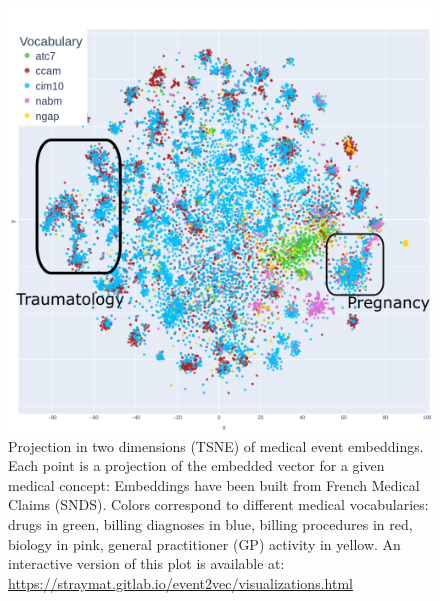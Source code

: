 \documentclass[french,12pt,twoside,a4paper]{book}
\begin{document}
\begin{figure}[!t]
  \begin{minipage}{0.32\textwidth}
    \caption{Projection in two dimensions (TSNE) of medical event embeddings.
      Each point is a projection of the embedded vector for a given medical
      concept: Embeddings have been built from French Medical Claims (SNDS).
      Colors correspond to different medical vocabularies: drugs in green, billing
      diagnoses in blue, billing procedures in red, biology in pink, general
      practitioner (GP) activity in yellow. An interactive version of this plot
      is available at:
      \url{https://straymat.gitlab.io/event2vec/visualizations.html}}
    \label{intro:tsne_plots}
  \end{minipage}
  \hfill
  \begin{minipage}{0.65\textwidth}
    \includegraphics[width=\linewidth]{img/chapter_3/snds2vec_annotated.png}
  \end{minipage}
\end{figure}

\end{document}
